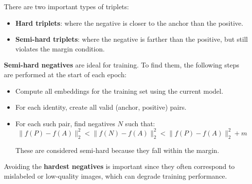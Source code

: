 There are two important types of triplets:
\begin{itemize}
  \item \textbf{Hard triplets}: where the negative is closer to the anchor than the positive.
  \item \textbf{Semi-hard triplets}: where the negative is farther than the positive, but still violates the margin condition.
\end{itemize}

\textbf{Semi-hard negatives} are ideal for training. To find them, the following steps are performed at the start of each epoch:
\begin{itemize}
  \item Compute all embeddings for the training set using the current model.
  \item For each identity, create all valid (anchor, positive) pairs.
  \item For each such pair, find negatives $N$ such that:  
  $$\| f(P) - f(A) \|_2^2 < \| f(N) - f(A) \|_2^2 < \| f(P) - f(A) \|_2^2 + m$$

These are considered semi-hard because they fall within the margin.
\end{itemize}

Avoiding the \textbf{hardest negatives} is important since they often correspond to mislabeled or low-quality images, which can degrade training performance.
